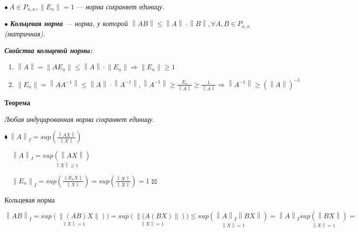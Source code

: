 \documentclass[a4paper, 12pt]{report}
\begin{document}
	$\bullet\ A\in P_{n,n}, \left \| E_n \right \|=1$ --- \textit{норма сохраняет единицу.}
	\par\bigskip
	$\bullet$ \textit{\textbf{Кольцевая норма} --- норма, у которой $\left \| AB \right \| \leqslant \left \| A \right \|\cdot \left \| B \right \|, \forall A,B \in P_{n,n}$ (матричная).}
	\par\bigskip
	\textbf{\textit{Свойства кольцевой нормы:}}
	\begin{enumerate}
		\item $\left \| A \right \|= \left \| AE_n \right \| \leqslant \left \| A \right \|\cdot \left \| E_n \right \|\Rightarrow \left \| E_n \right \| \geqslant 1$
		\item $\left \| E_n \right \|=\left \| AA^{-1} \right \|\leqslant \left \| A \right \|\cdot \left \| A^{-1} \right \|,\left \| A^{-1} \right\|\geqslant \frac{E_n}{\left \| A \right \|}\geqslant \frac{1}{\left \| A \right \|}\Rightarrow \left \| A^{-1} \right \|\geqslant (\left \| A \right \|)^{-1}$
	\end{enumerate}
	
	\textbf{Теорема}
	
	\textit{Любая индуцированная норма сохраняет единицу}.
	\par\bigskip
	$\blacklozenge\ \left \| A \right \|_I=sup \left ( \frac{\left \| AX \right \|}{\left \| X \right \|} \right )$
	\par\bigskip
	$\quad \left \| A \right \|_I=\underset{\left \| X \right \|\geqslant 1}{sup \left ( \left \| AX \right \|\right )}$
	\par\bigskip
	$\quad\left \| E_n \right \|_I=sup\left ( \frac{\left \| E_nX \right \|}{\left \| X \right \|} \right )=sup\left ( \frac{\left \| X \right \|}{\left \| X \right \|} \right )=1$
	$\boxtimes\ $
	\par\bigskip
	Кольцевая норма
	\par\bigskip
	$\left \| AB \right \|_I=\underset{\left \| X \right \|=1} {sup(\left \| (AB)X\right \|)})=\underset{\left \| X \right \|=1} {sup(\left \| (A(BX)\right \|)})\leqslant \underset{\left \| X \right \|=1} {sup(\left \| A \right \|_I \left \| BX \right \|)}=\left \| A \right \|_I \underset{\left \| X \right \|=1} {sup(\left \| BX \right \|)}=$
	
\end{document}
